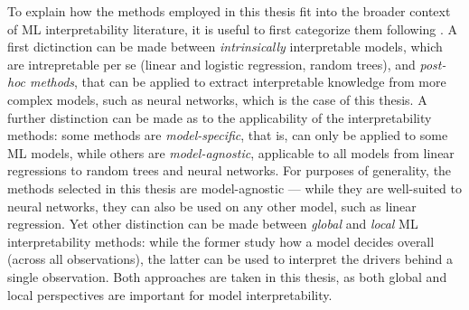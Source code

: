 		To explain how the methods employed in this thesis fit into the broader context of ML interpretability literature, it is useful to first categorize them following \cite{molnar2020interpretable}. A first dictinction can be made between \textit{intrinsically} interpretable models, which are intrepretable per se (linear and logistic regression, random trees), and \textit{post-hoc methods}, that can be applied to extract interpretable knowledge from more complex models, such as neural networks, which is the case of this thesis. A further distinction can be made as to the applicability of the interpretability methods: some methods are \textit{model-specific}, that is, can only be applied to some ML models, while others are \textit{model-agnostic}, applicable to all models from linear regressions to random trees and neural networks. For purposes of generality, the methods selected in this thesis are model-agnostic --- while they are well-suited to neural networks, they can also be used on any other model, such as linear regression. Yet other distinction can be made between \textit{global} and \textit{local} ML interpretability methods: while the former study how a model decides overall (across all observations), the latter can be used to interpret the drivers behind a single observation. Both approaches are taken in this thesis, as both global and local perspectives are important for model interpretability.
			
			
